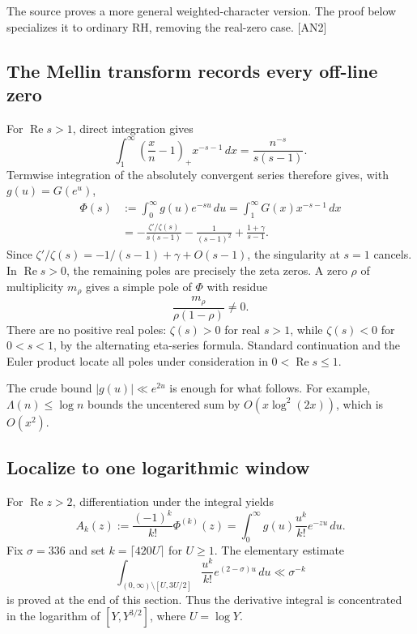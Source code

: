 \documentclass[11pt,a4paper]{article}
\numberwithin{equation}{section}
\theoremstyle{remark}\newtheorem{remark}[theorem]{Remark}
\newcommand{\Rea}{\operatorname{Re}}
\begin{document}
The source proves a more general weighted-character version.\cite{zerofree,landau} The proof below specializes it to ordinary RH, removing the real-zero case. \textsf{[AN2]}

\subsection{The Mellin transform records every off-line zero}

For $\Rea s>1$, direct integration gives
\[
\int_1^\infty\left(\frac{x}{n}-1\right)_+x^{-s-1}\,dx
       =\frac{n^{-s}}{s(s-1)}.
\]
Termwise integration of the absolutely convergent series therefore gives, with $g(u)=G(e^u)$,
\begin{equation}\label{eq:Phi}
\begin{split}
\Phi(s)&:=\int_0^\infty g(u)e^{-su}\,du
        =\int_1^\infty G(x)x^{-s-1}\,dx\\
&=-\frac{\zeta'/\zeta(s)}{s(s-1)}
  -\frac{1}{(s-1)^2}+\frac{1+\gamma}{s-1}.
\end{split}
\end{equation}
Since $\zeta'/\zeta(s)=-1/(s-1)+\gamma+O(s-1)$, the singularity at $s=1$ cancels. In $\Rea s>0$, the remaining poles are precisely the zeta zeros. A zero $\rho$ of multiplicity $m_\rho$ gives a simple pole of $\Phi$ with residue
\begin{equation}\label{eq:res}
\frac{m_\rho}{\rho(1-\rho)}\ne0.
\end{equation}
There are no positive real poles: $\zeta(s)>0$ for real $s>1$, while $\zeta(s)<0$ for $0<s<1$, by the alternating eta-series formula. Standard continuation and the Euler product locate all poles under consideration in $0<\Rea s\le1$.

The crude bound $|g(u)|\ll e^{2u}$ is enough for what follows. For example, $\Lambda(n)\le\log n$ bounds the uncentered sum by $O(x\log^2(2x))$, which is $O(x^2)$.

\subsection{Localize to one logarithmic window}

For $\Rea z>2$, differentiation under the integral yields
\begin{equation}\label{eq:Ak}
A_k(z):=\frac{(-1)^k}{k!}\Phi^{(k)}(z)
       =\int_0^\infty g(u)\frac{u^k}{k!}e^{-zu}\,du.
\end{equation}
Fix $\sigma=336$ and set $k=\lceil420U\rceil$ for $U\ge1$. The elementary estimate
\begin{equation}\label{eq:tails}
\int_{(0,\infty)\setminus[U,3U/2]}
\frac{u^k}{k!}e^{(2-\sigma)u}\,du\ll\sigma^{-k}
\end{equation}
is proved at the end of this section. Thus the derivative integral is concentrated in the logarithm of $[Y,Y^{3/2}]$, where $U=\log Y$.
\end{document}
